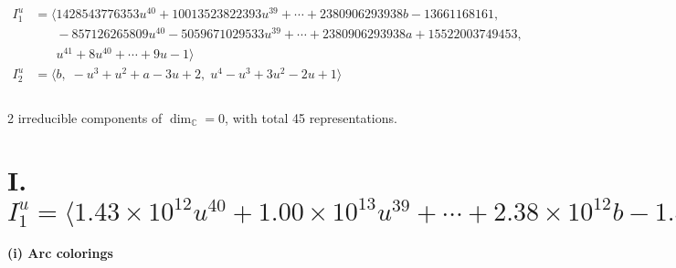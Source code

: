 \documentclass[1p]{elsarticle_modified}
\theoremstyle{definition}
\begin{document}
\begin{align*}
I^u_{1}&=\langle 
1428543776353 u^{40}+10013523822393 u^{39}+\cdots+2380906293938 b-13661168161,\\
\phantom{I^u_{1}}&\phantom{= \langle  }-857126265809 u^{40}-5059671029533 u^{39}+\cdots+2380906293938 a+15522003749453,\\
\phantom{I^u_{1}}&\phantom{= \langle  }u^{41}+8 u^{40}+\cdots+9 u-1\rangle \\
I^u_{2}&=\langle 
b,\;- u^3+u^2+a-3 u+2,\;u^4- u^3+3 u^2-2 u+1\rangle \\
\\
\end{align*}
\raggedright * 2 irreducible components of $\dim_{\mathbb{C}}=0$, with total 45 representations.\\
\newpage
\renewcommand{\arraystretch}{1}
\centering \section*{I. $I^u_{1}= \langle 1.43\times10^{12} u^{40}+1.00\times10^{13} u^{39}+\cdots+2.38\times10^{12} b-1.37\times10^{10},\;-8.57\times10^{11} u^{40}-5.06\times10^{12} u^{39}+\cdots+2.38\times10^{12} a+1.55\times10^{13},\;u^{41}+8 u^{40}+\cdots+9 u-1 \rangle$}
\flushleft \textbf{(i) Arc colorings}\\
\end{document}
